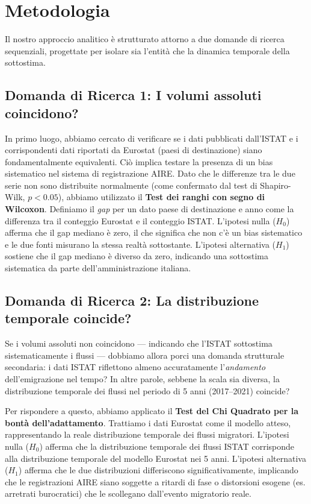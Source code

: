\section{Metodologia}\label{sec:methodology}

Il nostro approccio analitico è strutturato attorno a due domande di ricerca sequenziali, progettate per isolare sia l'entità che la dinamica temporale della sottostima.
\subsection{Domanda di Ricerca 1: I volumi assoluti coincidono?}
In primo luogo, abbiamo cercato di verificare se i dati pubblicati dall'ISTAT e i corrispondenti dati riportati da Eurostat (paesi di destinazione) siano fondamentalmente equivalenti.
Ciò implica testare la presenza di un bias sistematico nel sistema di registrazione AIRE.
Dato che le differenze tra le due serie non sono distribuite normalmente (come confermato dal test di Shapiro-Wilk, $p < 0.05$), abbiamo utilizzato il \textbf{Test dei ranghi con segno di Wilcoxon}.
Definiamo il \emph{gap} per un dato paese di destinazione e anno come la differenza tra il conteggio Eurostat e il conteggio ISTAT.
L'ipotesi nulla ($H_0$) afferma che il gap mediano è zero, il che significa che non c'è un bias sistematico e le due fonti misurano la stessa realtà sottostante.
L'ipotesi alternativa ($H_1$) sostiene che il gap mediano è diverso da zero, indicando una sottostima sistematica da parte dell'amministrazione italiana.
\subsection{Domanda di Ricerca 2: La distribuzione temporale coincide?}
Se i volumi assoluti non coincidono — indicando che l'ISTAT sottostima sistematicamente i flussi — dobbiamo allora porci una domanda strutturale secondaria: i dati ISTAT riflettono almeno accuratamente l'\emph{andamento} dell'emigrazione nel tempo?
In altre parole, sebbene la scala sia diversa, la distribuzione temporale dei flussi nel periodo di 5 anni (2017–2021) coincide?

Per rispondere a questo, abbiamo applicato il \textbf{Test del Chi Quadrato per la bontà dell'adattamento}.
Trattiamo i dati Eurostat come il modello atteso, rappresentando la reale distribuzione temporale dei flussi migratori.
L'ipotesi nulla ($H_0$) afferma che la distribuzione temporale dei flussi ISTAT corrisponde alla distribuzione temporale del modello Eurostat nei 5 anni.
L'ipotesi alternativa ($H_1$) afferma che le due distribuzioni differiscono significativamente, implicando che le registrazioni AIRE siano soggette a ritardi di fase o distorsioni esogene (es. arretrati burocratici) che le scollegano dall'evento migratorio reale.
